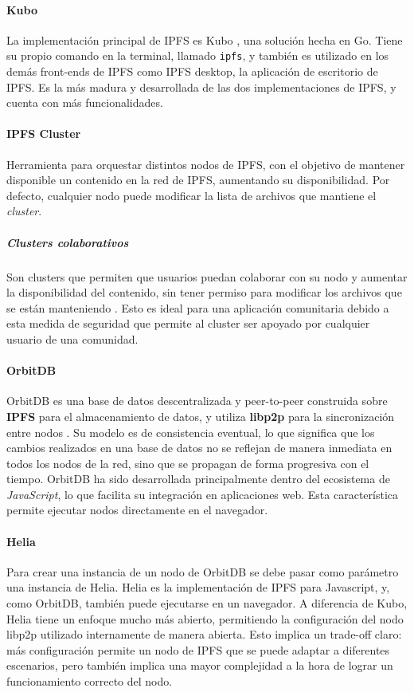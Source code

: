 \paragraph{Kubo} La implementación principal de IPFS es Kubo \cite{kubo}, una solución hecha en Go. Tiene su propio comando en la terminal, llamado \texttt{ipfs}, y también es utilizado en los demás front-ends de IPFS como IPFS desktop, la aplicación de escritorio de IPFS. Es la más madura y desarrollada de las dos implementaciones de IPFS, y cuenta con más funcionalidades.

\paragraph{IPFS Cluster} Herramienta para orquestar distintos nodos de IPFS, con el objetivo de mantener disponible un contenido en la red de IPFS, aumentando su disponibilidad. Por defecto, cualquier nodo puede modificar la lista de archivos que mantiene el \textit{cluster}.
\subparagraph{Clusters colaborativos} Son clusters que permiten que usuarios puedan colaborar con su nodo y aumentar la disponibilidad del contenido, sin tener permiso para modificar los archivos que se están manteniendo \cite{collaborative-clusters}. Esto es ideal para una aplicación comunitaria debido a esta medida de seguridad que permite al cluster ser apoyado por cualquier usuario de una comunidad.

\paragraph{OrbitDB}
OrbitDB es una base de datos descentralizada y peer-to-peer construida sobre \textbf{IPFS} para el almacenamiento de datos, y utiliza \textbf{libp2p} para la sincronización entre nodos \cite{orbitdb}. Su modelo es de consistencia eventual, lo que significa que los cambios realizados en una base de datos no se reflejan de manera inmediata en todos los nodos de la red, sino que se propagan de forma progresiva con el tiempo.
OrbitDB ha sido desarrollada principalmente dentro del ecosistema de \textit{JavaScript}, lo que facilita su integración en aplicaciones web. Esta característica permite ejecutar nodos directamente en el navegador.

\paragraph{Helia} Para crear una instancia de un nodo de OrbitDB se debe pasar como parámetro una instancia de Helia. Helia \cite{helia} es la implementación de IPFS para Javascript, y, como OrbitDB, también puede ejecutarse en un navegador. A diferencia de Kubo, Helia tiene un enfoque mucho más abierto, permitiendo la configuración del nodo libp2p utilizado internamente de manera abierta. Esto implica un trade-off claro: más configuración permite un nodo de IPFS que se puede adaptar a diferentes escenarios, pero también implica una mayor complejidad a la hora de lograr un funcionamiento correcto del nodo.

